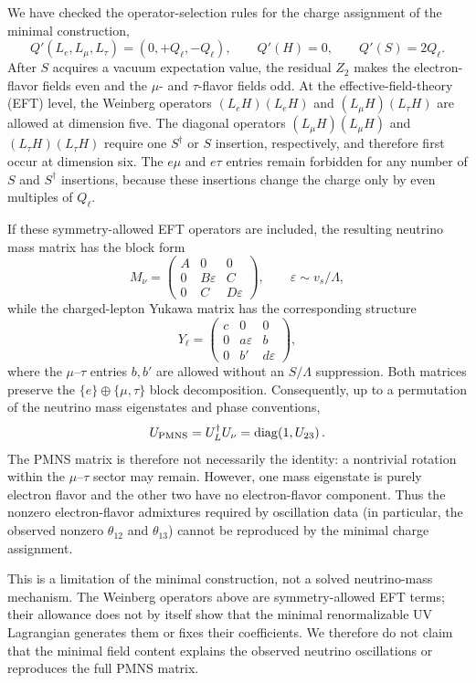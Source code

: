 \documentclass[12pt,a4paper]{article}
\begin{document}

We have checked the operator-selection rules for the charge assignment of the minimal construction,
\[
Q'(L_e,L_\mu,L_\tau)=(0,+Q_\ell,-Q_\ell),\qquad
Q'(H)=0,\qquad Q'(S)=2Q_\ell.
\]
After \(S\) acquires a vacuum expectation value, the residual \(Z_2\) makes the electron-flavor fields even and the \(\mu\)- and \(\tau\)-flavor fields odd. At the effective-field-theory (EFT) level, the Weinberg operators \((L_eH)(L_eH)\) and \((L_\mu H)(L_\tau H)\) are allowed at dimension five. The diagonal operators \((L_\mu H)(L_\mu H)\) and \((L_\tau H)(L_\tau H)\) require one \(S^\dagger\) or \(S\) insertion, respectively, and therefore first occur at dimension six. The \(e\mu\) and \(e\tau\) entries remain forbidden for any number of \(S\) and \(S^\dagger\) insertions, because these insertions change the charge only by even multiples of \(Q_\ell\).

If these symmetry-allowed EFT operators are included, the resulting neutrino mass matrix has the block form
\[
M_\nu=
\begin{pmatrix}
A&0&0\\
0&B\varepsilon&C\\
0&C&D\varepsilon
\end{pmatrix},
\qquad \varepsilon\sim v_s/\Lambda,
\]
while the charged-lepton Yukawa matrix has the corresponding structure
\[
Y_\ell=
\begin{pmatrix}
c&0&0\\
0&a\varepsilon&b\\
0&b'&d\varepsilon
\end{pmatrix},
\]
where the \(\mu\)--\(\tau\) entries \(b,b'\) are allowed without an \(S/\Lambda\) suppression. Both matrices preserve the \(\{e\}\oplus\{\mu,\tau\}\) block decomposition. Consequently, up to a permutation of the neutrino mass eigenstates and phase conventions,
\[
U_{\rm PMNS}=U_L^\dagger U_\nu
=\operatorname{diag}\!\left(1,U_{23}\right).
\]
The PMNS matrix is therefore not necessarily the identity: a nontrivial rotation within the \(\mu\)--\(\tau\) sector may remain. However, one mass eigenstate is purely electron flavor and the other two have no electron-flavor component. Thus the nonzero electron-flavor admixtures required by oscillation data (in particular, the observed nonzero \(\theta_{12}\) and \(\theta_{13}\)) cannot be reproduced by the minimal charge assignment.

This is a limitation of the minimal construction, not a solved neutrino-mass mechanism. The Weinberg operators above are symmetry-allowed EFT terms; their allowance does not by itself show that the minimal renormalizable UV Lagrangian generates them or fixes their coefficients. We therefore do not claim that the minimal field content explains the observed neutrino oscillations or reproduces the full PMNS matrix.
\end{document}
